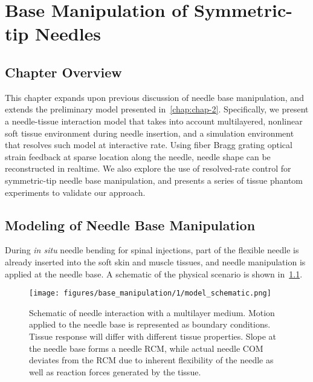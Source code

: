 \chapter{Base Manipulation of Symmetric-tip Needles} \label{chap:chap-3}

\section{Chapter Overview}
\label{sec:chap-3-overview}

This chapter expands upon previous discussion of needle base manipulation, and extends the preliminary model presented in~\cref{chap:chap-2}. Specifically, we present a needle-tissue interaction model that takes into account multilayered, nonlinear soft tissue environment during needle insertion, and a simulation environment that resolves such model at interactive rate. Using fiber Bragg grating optical strain feedback at sparse location along the needle, needle shape can be reconstructed in realtime. We also explore the use of resolved-rate control for symmetric-tip needle base manipulation, and presents a series of tissue phantom experiments to validate our approach.


\section{Modeling of Needle Base Manipulation}
\label{sec:chap-3-model}

During \textit{in situ} needle bending for spinal injections, part of the flexible needle is already inserted into the soft skin and muscle tissues, and needle manipulation is applied at the needle base. A schematic of the physical scenario is shown in~\cref{fig:chap-3-model-schematic}.

\begin{figure}[t]
  \centering
  \texttt{[image: figures/base\_manipulation/1/model\_schematic.png]}
  \caption{Schematic of needle interaction with a multilayer medium. Motion applied to the needle base is represented as boundary conditions. Tissue response will differ with different tissue properties. Slope at the needle base forms a needle RCM, while actual needle COM deviates from the RCM due to inherent flexibility of the needle as well as reaction forces generated by the tissue.}
  \label{fig:chap-3-model-schematic}
\end{figure}

